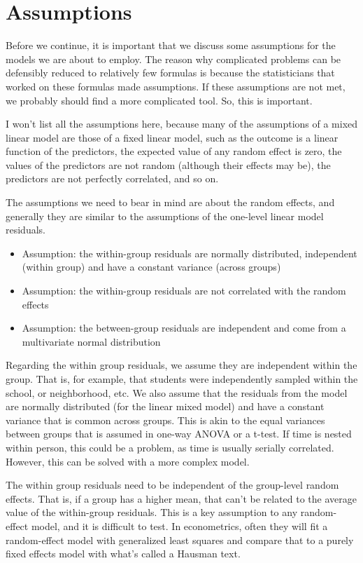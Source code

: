 \section{Assumptions}

Before we continue, it is important that we discuss some assumptions for the models we are about to employ. The reason why complicated problems can be defensibly reduced to relatively few formulas is because the statisticians that worked on these formulas made assumptions. If these assumptions are not met, we probably should find a more complicated tool. So, this is important.

I won't list all the assumptions here, because many of the assumptions of a mixed linear model are those of a fixed linear model, such as the outcome is a linear function of the predictors, the expected value of any random effect is zero, the values of the predictors are not random (although their effects may be), the predictors are not perfectly correlated, and so on.

The assumptions we need to bear in mind are about the random effects, and generally they are similar to the assumptions of the one-level linear model residuals.


\begin{itemize}
  \item Assumption: the within-group residuals are normally distributed, independent (within group) and have a constant variance (across groups)
  \item Assumption: the within-group residuals are not correlated with the random effects
  \item Assumption: the between-group residuals are independent and come from a multivariate normal distribution
\end{itemize}

Regarding the within group residuals, we assume they are independent within the group. That is, for example, that students were independently sampled within the school, or neighborhood, etc. We also assume that the residuals from the model are normally distributed (for the linear mixed model) and have a constant variance that is common across groups. This is akin to the equal variances between groups that is assumed in one-way ANOVA or a t-test. If time is nested within person, this could be a problem, as time is usually serially correlated. However, this can be solved with a more complex model.

The within group residuals need to be independent of the group-level random effects. That is, if a group has a higher mean, that can't be related to the average value of the within-group residuals. This is a key assumption to any random-effect model, and it is difficult to test. In econometrics, often they will fit a random-effect model with generalized least squares and compare that to a purely fixed effects model with what's called a Hausman text.

